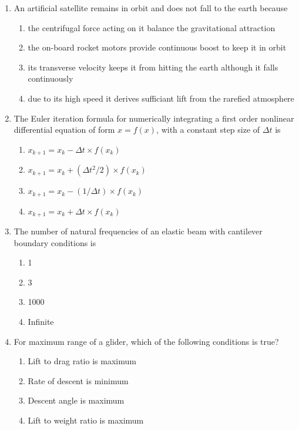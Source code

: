 \documentclass{article}
\begin{document}
\begin{enumerate}
    \item An artificial satellite remains in orbit and does not fall to the earth because
    \begin{enumerate}
        \item the centrifugal force acting on it balance the gravitational attraction 
        \item the on-board rocket motors provide continuous boost to keep it in orbit 
        \item its transverse velocity keeps it from hitting the earth although it falls  continuously 
        \item due to its high speed it derives sufficiant lift from the rarefied atmosphere 
    \end{enumerate}


    \item The Euler iteration formula for numerically integrating a first order nonlinear differential equation of form $x = f(x)$, with a constant step size of $\Delta t$ is 
    \begin{multicols}{2}
    \begin{enumerate}
        \item $x_{k+1} = x_k - \Delta t \times f(x_k)$ 
        \item $x_{k+1} = x_k + \left( \Delta t^2 / 2 \right) \times f(x_k)$ 
        \item $x_{k+1} = x_k - (1 / \Delta t) \times f(x_k)$ 
        \item $x_{k+1} = x_k + \Delta t \times f(x_k)$
    \end{enumerate}
    \end{multicols}
        

    \item The number of natural frequencies of an elastic beam with cantilever boundary conditions is
    \begin{multicols}{4}
    \begin{enumerate}
        \item 1 
        \item 3 
        \item 1000 
        \item Infinite
    \end{enumerate}
    \end{multicols}
        

    \item For maximum range of a glider, which of the following conditions is true?
    \begin{enumerate}
        \item Lift to drag ratio is maximum
        \item Rate of descent is minimum
        \item Descent angle is maximum
        \item Lift to weight ratio is maximum 
    \end{enumerate}
        

\end{enumerate}
\end{document}
